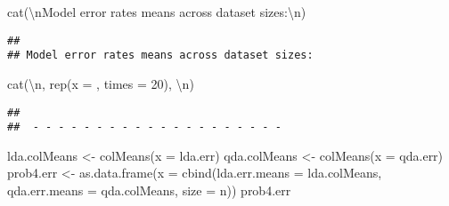 \documentclass[
]{article}
\newenvironment{Shaded}{\begin{snugshade}}{\end{snugshade}}
\newcommand{\AttributeTok}[1]{\textcolor[rgb]{0.77,0.63,0.00}{#1}}
\newcommand{\DecValTok}[1]{\textcolor[rgb]{0.00,0.00,0.81}{#1}}
\newcommand{\FunctionTok}[1]{\textcolor[rgb]{0.00,0.00,0.00}{#1}}
\newcommand{\NormalTok}[1]{#1}
\newcommand{\OtherTok}[1]{\textcolor[rgb]{0.56,0.35,0.01}{#1}}
\newcommand{\SpecialCharTok}[1]{\textcolor[rgb]{0.00,0.00,0.00}{#1}}
\newcommand{\StringTok}[1]{\textcolor[rgb]{0.31,0.60,0.02}{#1}}
\begin{document}
\begin{Shaded}
\begin{Highlighting}[]
\FunctionTok{cat}\NormalTok{(}\StringTok{\textquotesingle{}}\SpecialCharTok{\textbackslash{}n}\StringTok{Model error rates means across dataset sizes:}\SpecialCharTok{\textbackslash{}n}\StringTok{\textquotesingle{}}\NormalTok{)}
\end{Highlighting}
\end{Shaded}

\begin{verbatim}
## 
## Model error rates means across dataset sizes:
\end{verbatim}

\begin{Shaded}
\begin{Highlighting}[]
\FunctionTok{cat}\NormalTok{(}\StringTok{\textquotesingle{}}\SpecialCharTok{\textbackslash{}n}\StringTok{\textquotesingle{}}\NormalTok{, }\FunctionTok{rep}\NormalTok{(}\AttributeTok{x =} \StringTok{\textquotesingle{}{-}\textquotesingle{}}\NormalTok{, }\AttributeTok{times =} \DecValTok{20}\NormalTok{), }\StringTok{\textquotesingle{}}\SpecialCharTok{\textbackslash{}n}\StringTok{\textquotesingle{}}\NormalTok{)}
\end{Highlighting}
\end{Shaded}

\begin{verbatim}
## 
##  - - - - - - - - - - - - - - - - - - - -
\end{verbatim}

\begin{Shaded}
\begin{Highlighting}[]
\NormalTok{lda.colMeans }\OtherTok{\textless{}{-}} \FunctionTok{colMeans}\NormalTok{(}\AttributeTok{x =}\NormalTok{ lda.err)}
\NormalTok{qda.colMeans }\OtherTok{\textless{}{-}} \FunctionTok{colMeans}\NormalTok{(}\AttributeTok{x =}\NormalTok{ qda.err)}
\NormalTok{prob4.err }\OtherTok{\textless{}{-}} \FunctionTok{as.data.frame}\NormalTok{(}\AttributeTok{x =} \FunctionTok{cbind}\NormalTok{(}\StringTok{\textquotesingle{}lda.err.means\textquotesingle{}} \OtherTok{=}\NormalTok{ lda.colMeans, }\StringTok{\textquotesingle{}qda.err.means\textquotesingle{}} \OtherTok{=}\NormalTok{ qda.colMeans, }\StringTok{\textquotesingle{}size\textquotesingle{}} \OtherTok{=}\NormalTok{ n))}
\NormalTok{prob4.err}
\end{Highlighting}
\end{Shaded}
\end{document}
